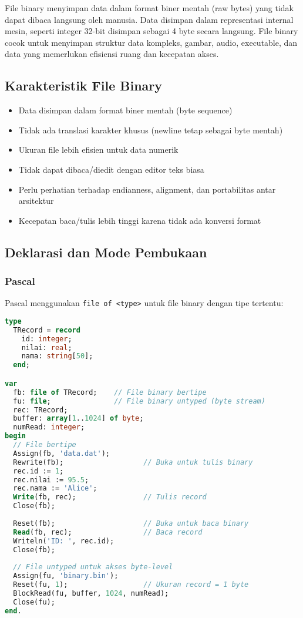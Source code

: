 \documentclass[../main.tex]{subfiles}
\begin{document}
File binary menyimpan data dalam format biner mentah (raw bytes) yang tidak dapat dibaca langsung oleh manusia. Data disimpan dalam representasi internal mesin, seperti integer 32-bit disimpan sebagai 4 byte secara langsung. File binary cocok untuk menyimpan struktur data kompleks, gambar, audio, executable, dan data yang memerlukan efisiensi ruang dan kecepatan akses.

\subsection{Karakteristik File Binary}
\begin{itemize}
  \item Data disimpan dalam format biner mentah (byte sequence)
  \item Tidak ada translasi karakter khusus (newline tetap sebagai byte mentah)
  \item Ukuran file lebih efisien untuk data numerik
  \item Tidak dapat dibaca/diedit dengan editor teks biasa
  \item Perlu perhatian terhadap endianness, alignment, dan portabilitas antar arsitektur
  \item Kecepatan baca/tulis lebih tinggi karena tidak ada konversi format
\end{itemize}

\subsection{Deklarasi dan Mode Pembukaan}

\subsubsection{Pascal}
Pascal menggunakan \texttt{file of <type>} untuk file binary dengan tipe tertentu:

\begin{lstlisting}[language=Pascal, caption={Deklarasi dan mode file binary Pascal}]
type
  TRecord = record
    id: integer;
    nilai: real;
    nama: string[50];
  end;

var
  fb: file of TRecord;    // File binary bertipe
  fu: file;               // File binary untyped (byte stream)
  rec: TRecord;
  buffer: array[1..1024] of byte;
  numRead: integer;
begin
  // File bertipe
  Assign(fb, 'data.dat');
  Rewrite(fb);                   // Buka untuk tulis binary
  rec.id := 1;
  rec.nilai := 95.5;
  rec.nama := 'Alice';
  Write(fb, rec);                // Tulis record
  Close(fb);
  
  Reset(fb);                     // Buka untuk baca binary
  Read(fb, rec);                 // Baca record
  Writeln('ID: ', rec.id);
  Close(fb);
  
  // File untyped untuk akses byte-level
  Assign(fu, 'binary.bin');
  Reset(fu, 1);                  // Ukuran record = 1 byte
  BlockRead(fu, buffer, 1024, numRead);
  Close(fu);
end.
\end{lstlisting}
\end{document}
